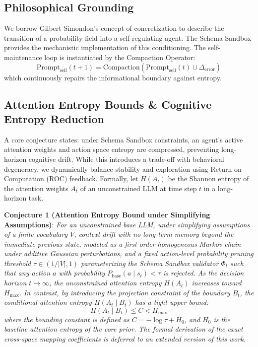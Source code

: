 \documentclass[10pt,journal,compsoc]{IEEEtran}
\begin{document}
\subsection{Philosophical Grounding}
We borrow Gilbert Simondon's concept of concretization to describe the transition of a probability field into a self-regulating agent. The Schema Sandbox provides the mechanistic implementation of this conditioning. The self-maintenance loop is instantiated by the Compaction Operator:
\begin{equation}
\text{Prompt}_{\text{self}}(t+1) = \text{Compaction}(\text{Prompt}_{\text{self}}(t) \cup \Delta_{\text{error}})
\end{equation}
which continuously repairs the informational boundary against entropy.

\subsection{Attention Entropy Bounds \& Cognitive Entropy Reduction}
A core conjecture states: under Schema Sandbox constraints, an agent's active attention weights and action space entropy are compressed, preventing long-horizon cognitive drift. While this introduces a trade-off with behavioral degeneracy, we dynamically balance stability and exploration using Return on Computation (ROC) feedback. Formally, let $H(A_t)$ be the Shannon entropy of the attention weights $A_t$ of an unconstrained LLM at time step $t$ in a long-horizon task.

\textbf{Conjecture 1 (Attention Entropy Bound under Simplifying Assumptions)}: \textit{For an unconstrained base LLM, under simplifying assumptions of a finite vocabulary $V$, context drift with no long-term memory beyond the immediate previous state, modeled as a first-order homogeneous Markov chain under additive Gaussian perturbations, and a fixed action-level probability pruning threshold $\tau \in (1/|V|, 1)$ parameterizing the Schema Sandbox validator $\Phi_t$ such that any action $a$ with probability $P_{\text{base}}(a \mid s_t) < \tau$ is rejected. As the decision horizon $t \to \infty$, the unconstrained attention entropy $H(A_t)$ increases toward $H_{\max}$. In contrast, by introducing the projection constraint of the boundary $B_t$, the conditional attention entropy $H(A_t \mid B_t)$ has a tight upper bound:}
\begin{equation}
H(A_t \mid B_t) \le C < H_{\max}
\end{equation}
\textit{where the bounding constant is defined as $C = -\log \tau + H_0$, and $H_0$ is the baseline attention entropy of the core prior. The formal derivation of the exact cross-space mapping coefficients is deferred to an extended version of this work.}
\end{document}

